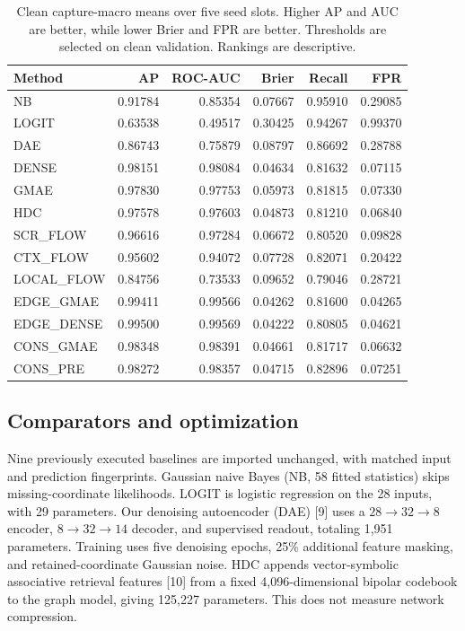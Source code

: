 \documentclass[11pt,letterpaper]{article}
\begin{document}
\begin{table}[tbp]
\centering
\caption{Clean capture-macro means over five seed slots. Higher AP and AUC are better, while lower Brier and FPR are better. Thresholds are selected on clean validation. Rankings are descriptive.}
\fontsize{9.5}{11}\selectfont
\renewcommand{\arraystretch}{1.12}
\setlength{\tabcolsep}{4pt}
\begin{tabular*}{\linewidth}{@{\extracolsep{\fill}}lrrrrr@{}}
\toprule
\textbf{Method} & \textbf{AP} & \textbf{ROC-AUC} & \textbf{Brier} & \textbf{Recall} & \textbf{FPR} \\
\midrule
NB & 0.91784 & 0.85354 & 0.07667 & 0.95910 & 0.29085 \\
LOGIT & 0.63538 & 0.49517 & 0.30425 & 0.94267 & 0.99370 \\
DAE & 0.86743 & 0.75879 & 0.08797 & 0.86692 & 0.28788 \\
DENSE & 0.98151 & 0.98084 & 0.04634 & 0.81632 & 0.07115 \\
GMAE & 0.97830 & 0.97753 & 0.05973 & 0.81815 & 0.07330 \\
HDC & 0.97578 & 0.97603 & 0.04873 & 0.81210 & 0.06840 \\
SCR\_FLOW & 0.96616 & 0.97284 & 0.06672 & 0.80520 & 0.09828 \\
CTX\_FLOW & 0.95602 & 0.94072 & 0.07728 & 0.82071 & 0.20422 \\
LOCAL\_FLOW & 0.84756 & 0.73533 & 0.09652 & 0.79046 & 0.28721 \\
EDGE\_GMAE & 0.99411 & 0.99566 & 0.04262 & 0.81600 & 0.04265 \\
EDGE\_DENSE & 0.99500 & 0.99569 & 0.04222 & 0.80805 & 0.04621 \\
CONS\_GMAE & 0.98348 & 0.98391 & 0.04661 & 0.81717 & 0.06632 \\
CONS\_PRE & 0.98272 & 0.98357 & 0.04715 & 0.82896 & 0.07251 \\
\bottomrule
\end{tabular*}
\end{table}

\subsection{Comparators and optimization}

Nine previously executed baselines are imported unchanged, with matched input and prediction fingerprints. Gaussian naive Bayes (NB, 58 fitted statistics) skips missing-coordinate likelihoods. LOGIT is logistic regression on the 28 inputs, with 29 parameters. Our denoising autoencoder (DAE) [9] uses a \(28\to32\to8\) encoder, \(8\to32\to14\) decoder, and supervised readout, totaling 1,951 parameters. Training uses five denoising epochs, 25\% additional feature masking, and retained-coordinate Gaussian noise. HDC appends vector-symbolic associative retrieval features [10] from a fixed 4,096-dimensional bipolar codebook to the graph model, giving 125,227 parameters. This does not measure network compression.\par
\end{document}
